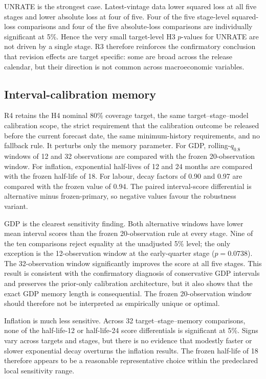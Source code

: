 UNRATE is the strongest case. Latest-vintage data lower squared loss at all
five stages and lower absolute loss at four of five. Four of the five
stage-level squared-loss comparisons and four of the five absolute-loss
comparisons are individually significant at 5\%. Hence the very small
target-level H3 \(p\)-values for UNRATE are not driven by a single stage. R3
therefore reinforces the confirmatory conclusion that revision effects are
target specific: some are broad across the release calendar, but their
direction is not common across macroeconomic variables.

\subsection{Interval-calibration memory}
\label{subsec:h4_interval_robustness}

R4 retains the H4 nominal 80\% coverage target, the same target--stage--model
calibration scope, the strict requirement that the calibration outcome be
released before the current forecast date, the same minimum-history
requirements, and no fallback rule. It perturbs only the memory parameter.
For GDP, rolling-\(q_{0.8}\) windows of 12 and 32 observations are compared
with the frozen 20-observation window. For inflation, exponential half-lives
of 12 and 24 months are compared with the frozen half-life of 18. For labour,
decay factors of 0.90 and 0.97 are compared with the frozen value of 0.94.
The paired interval-score differential is alternative minus frozen-primary, so
negative values favour the robustness variant.

GDP is the clearest sensitivity finding. Both alternative windows have lower
mean interval scores than the frozen 20-observation rule at every stage.
Nine of the ten comparisons reject equality at the unadjusted 5\% level; the
only exception is the 12-observation window at the early-quarter stage
(\(p=0.0738\)). The 32-observation window significantly improves the score at
all five stages. This result is consistent with the confirmatory diagnosis of conservative
GDP intervals and preserves the prior-only calibration architecture, but it
also shows that the exact GDP memory length is consequential. The frozen
20-observation window should therefore not be interpreted as empirically
unique or optimal.

Inflation is much less sensitive. Across 32 target--stage--memory
comparisons, none of the half-life-12 or half-life-24 score differentials is
significant at 5\%. Signs vary across targets and stages, but there is no
evidence that modestly faster or slower exponential decay overturns the
inflation results. The frozen half-life of 18 therefore appears to be a
reasonable representative choice within the predeclared local sensitivity
range.

